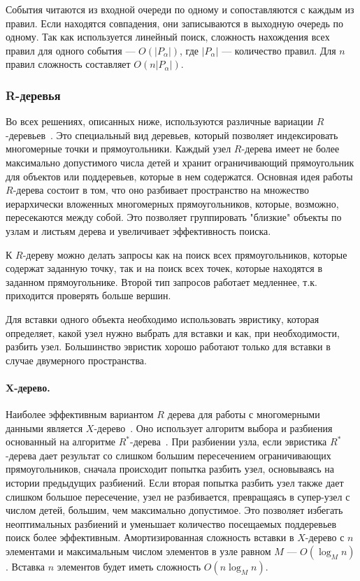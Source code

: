 \documentclass[14pt]{article}
\begin{document}
События читаются из входной очереди по одному и сопоставляются с каждым из правил. Если находятся совпадения, они записываются в выходную очередь по одному. Так как используется линейный поиск, сложность нахождения всех правил для одного события --- $O(|P_\alpha|)$, где $|P_\alpha|$ --- количество правил. Для $n$ правил сложность составляет $O(n|P_\alpha|)$.

\subsubsection{R-деревья}
Во всех решениях, описанных ниже, используются различные вариации $R$-деревьев~\cite{r-tree}. Это специальный вид деревьев, который позволяет индексировать многомерные точки и прямоугольники. Каждый узел $R$-дерева имеет не более максимально допустимого числа детей и хранит ограничивающий прямоугольник для объектов или поддеревьев, которые в нем содержатся. Основная идея работы $R$-дерева состоит в том, что оно разбивает пространство на множество иерархически вложенных многомерных прямоугольников, которые, возможно, пересекаются между собой. Это позволяет группировать "близкие" объекты по узлам и листьям дерева и увеличивает эффективность поиска.

К $R$-дереву можно делать запросы как на поиск всех прямоугольников, которые содержат заданную точку, так и на поиск всех точек, которые находятся в заданном прямоугольнике. Второй тип запросов работает медленнее, т.к. приходится проверять больше вершин.

Для вставки одного объекта необходимо использовать эвристику, которая определяет, какой узел нужно выбрать для вставки и как, при необходимости, разбить узел. Большинство эвристик хорошо работают только для вставки в случае двумерного пространства.

\paragraph{X-дерево.} Наиболее эффективным вариантом $R$ дерева для работы с многомерными данными является $X$-дерево~\cite{x-tree}. Оно использует алгоритм выбора и разбиения основанный на алгоритме $R^*$-дерева~\cite{r-star-tree}. При разбиении узла, если эвристика $R^*$-дерева дает результат со слишком большим пересечением ограничивающих прямоугольников, сначала происходит попытка разбить узел, основываясь на истории предыдущих разбиений. Если вторая попытка разбить узел также дает слишком большое пересечение, узел не разбивается, превращаясь в супер-узел с числом детей, большим, чем максимально допустимое. Это позволяет избегать неоптимальных разбиений и уменьшает количество посещаемых поддеревьев поиск более эффективным. Амортизированная сложность вставки в $X$-дерево с $n$ элементами и максимальным числом элементов в узле равном $M$ --- $O(\log_M n)$. Вставка $n$ элементов будет иметь сложность $O(n\log_M n)$.
\end{document}
